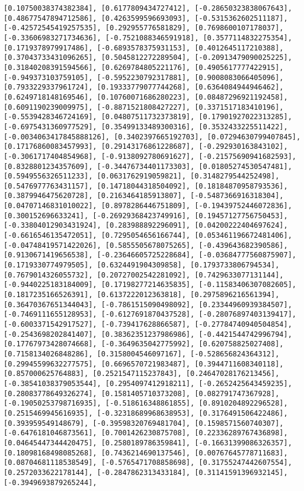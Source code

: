 \documentclass[11pt]{article}
\begin{document}
\begin{Verbatim}[commandchars=\\\{\}]
[0.10750038374382384], [0.6177809434727412], [-0.28650323838067643], [0.48677547894712586], [0.4263599596693093], [-0.5315362602511187], [-0.42572545419257535], [0.292955776581829], [0.7698600107178037], [-0.33606983271734636], [-0.7521088346591918], [0.3577114832275354], [0.1719378979917486], [-0.6893578375931153], [0.4012645117210388], [0.37043733431096265], [0.5045812272289504], [-0.20913479090025225], [0.31840208391594566], [0.6269784805221176], [0.4905617777422915], [-0.949373103759105], [-0.5952230792317881], [0.9008083066405096], [0.7933229337961724], [0.19333779077744268], [0.6364084944946462], [0.6249718148169546], [0.10760071686280223], [0.08487296921192458], [0.6091190239009975], [-0.8871521808427227], [0.3371517183410196], [-0.5539428346724169], [0.04807511732373819], [0.17901927022313285], [-0.6975431360977529], [0.35499133489300316], [0.3532433225511422], [-0.0034063417845888126], [0.3402397665192703], [0.07294630799407845], [0.17176860083457993], [0.29143176861228687], [-0.292930163843102], [-0.3061717404854968], [-0.9138092780691627], [-0.21575690941682593], [0.8328801234357609], [-0.34476734401173303], [0.01805274530547481], [0.5949556326511233], [0.0631762919059821], [0.3148279544252498], [0.5476977763431157], [0.14718044318504092], [0.18184870958793536], [0.3879946475620728], [0.2163464185913807], [-0.5487366916318304], [0.04707146831010022], [0.8978286446751809], [-0.19439752446072836], [0.300152696633241], [-0.26929368423749916], [0.19457127756750453], [-0.33804012903431924], [0.283988892296091], [0.04200222404697624], [-0.6616546135472051], [0.7295054656166744], [0.053461196672481406], [-0.04748419571422026], [0.5855505678075265], [-0.439643682390586], [0.9130671419656538], [-0.23646605725228684], [-0.03684777560875907], [0.1719330774979505], [0.6324491904309858], [0.1793733806794534], [0.7679014326055732], [0.20727002542281092], [0.7429633077131144], [-0.9440225183184009], [0.17198277214635835], [-0.11583406307082605], [0.1817235166526391], [0.6137222012363818], [0.2975896216561394], [0.36470367651344043], [-0.7861515090498092], [0.23344960939384507], [-0.7469111655128953], [-0.6127691870437528], [-0.28076897403139417], [-0.6003371542917527], [-0.739417628866587], [-0.27784740940504854], [-0.2543698202841407], [0.38362351237986986], [-0.4421544742996794], [0.17767973428074668], [-0.3649635042775992], [0.620758825027408], [0.7158134026848286], [0.3158004546097167], [-0.528656824364312], [0.29945599632277575], [0.6696570721983487], [0.3944711608340118], [0.857000625764883], [0.2521547115237843], [0.24647028176213456], [-0.38541038379053544], [0.2954097412918211], [-0.2652425643459235], [0.28083778649326274], [0.1581405710373208], [0.082791747367928], [-0.19050253798716935], [-0.518616348861855], [0.8910204892296528], [0.2515469945616935], [-0.32318689968638953], [0.3176491506422486], [0.393959549148679], [-0.39598320769481704], [0.1598571560740307], [-0.6476181046873561], [0.7001426230875708], [0.22336289767436898], [0.04645447344420475], [0.2580189786359841], [-0.16631399086326357], [0.18098168498085268], [0.7436214690137546], [0.00767645778711683], [0.08704681118538549], [-0.5765471708858698], [0.31755247442607554], [0.2572033622178144], [-0.2847862313433184], [0.31141591396932145], [-0.3949693879265244], 
\end{Verbatim}
\end{document}
